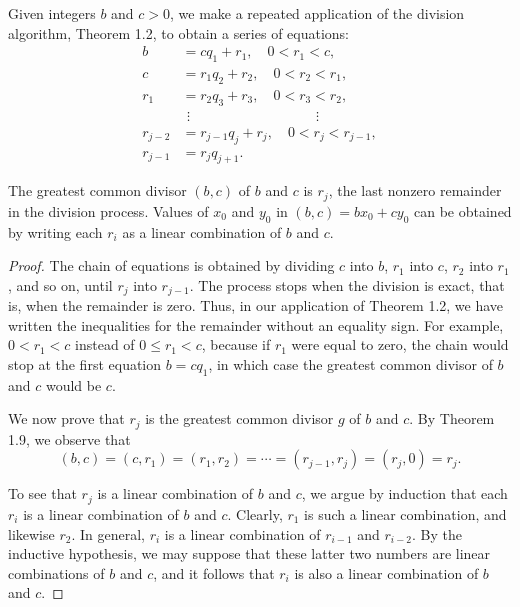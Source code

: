 \documentclass[11pt]{article}
\begin{document}
\begin{theorem}
    Given integers \( b \) and \( c > 0 \), we make a repeated application of the division algorithm, Theorem 1.2, to obtain a series of equations:
    \[
        \begin{aligned}
            b       & = cq_1 + r_1, \quad 0 < r_1 < c,                                         \\
            c       & = r_1q_2 + r_2, \quad 0 < r_2 < r_1,                                     \\
            r_1     & = r_2q_3 + r_3, \quad 0 < r_3 < r_2,                                     \\
                    & \ \, \vdots \quad \quad \quad \quad \quad \quad \quad \quad \quad \vdots \\
            r_{j-2} & = r_{j-1}q_j + r_j, \quad 0 < r_j < r_{j-1},                             \\
            r_{j-1} & = r_jq_{j+1}.
        \end{aligned}
    \]

    The greatest common divisor \((b, c)\) of \( b \) and \( c \) is \( r_j \), the
    last nonzero remainder in the division process. Values of \( x_0 \) and \( y_0
    \) in \((b, c) = bx_0 + cy_0 \) can be obtained by writing each \( r_i \) as a
    linear combination of \( b \) and \( c \).
\end{theorem}

\begin{proof}
    The chain of equations is obtained by dividing \(c\) into \(b\), \(r_1\) into \(c\), \(r_2\) into \(r_1\), and so on, until \(r_j\) into \(r_{j-1}\). The process stops when the division is exact, that is, when the remainder is zero. Thus, in our application of Theorem 1.2, we have written the inequalities for the remainder without an equality sign. For example, \(0 < r_1 < c\) instead of \(0 \leq r_1 < c\), because if \(r_1\) were equal to zero, the chain would stop at the first equation \(b = cq_1\), in which case the greatest common divisor of \(b\) and \(c\) would be \(c\).

    We now prove that \(r_j\) is the greatest common divisor \(g\) of \(b\) and
    \(c\). By Theorem 1.9, we observe that
    \[
        (b, c) = (c, r_1) = (r_1, r_2) = \cdots = (r_{j-1}, r_j) = (r_j, 0) = r_j.
    \]

    To see that \(r_j\) is a linear combination of \(b\) and \(c\), we argue by
    induction that each \(r_i\) is a linear combination of \(b\) and \(c\).
    Clearly, \(r_1\) is such a linear combination, and likewise \(r_2\). In
    general, \(r_i\) is a linear combination of \(r_{i-1}\) and \(r_{i-2}\). By the
    inductive hypothesis, we may suppose that these latter two numbers are linear
    combinations of \(b\) and \(c\), and it follows that \(r_i\) is also a linear
    combination of \(b\) and \(c\).
\end{proof}
\end{document}
